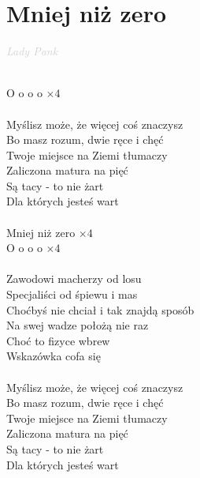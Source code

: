 \documentclass[a5paper, 10pt]{book}
\begin{document}
\newpage
\section{Mniej niż zero}\textcolor{lightgray}{\textit{Lady Pank}}\\~\\
\begin{minipage}[t]{0.8\textwidth}
  O o o o $\times 4$\\
  \\
  Myślisz może, że więcej coś znaczysz\\
  Bo masz rozum, dwie ręce i chęć\\
  Twoje miejsce na Ziemi tłumaczy\\
  Zaliczona matura na pięć\\
  Są tacy - to nie żart\\
  Dla których jesteś wart\\
  \\
  Mniej niż zero $\times 4$\\
  O o o o $\times 4$\\
  \\
  Zawodowi macherzy od losu\\
  Specjaliści od śpiewu i mas\\
  Choćbyś nie chciał i tak znajdą sposób\\
  Na swej wadze położą nie raz\\
  Choć to fizyce wbrew\\
  Wskazówka cofa się\\
  \\
  Myślisz może, że więcej coś znaczysz\\
  Bo masz rozum, dwie ręce i chęć\\
  Twoje miejsce na Ziemi tłumaczy\\
  Zaliczona matura na pięć\\
  Są tacy - to nie żart\\
  Dla których jesteś wart\\
\end{minipage}
\end{document}
